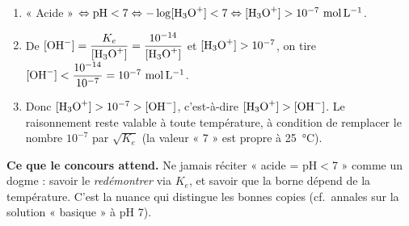\documentclass[11pt,a4paper]{article}
\begin{document}
\begin{corrbox}
\begin{enumerate}[label=\alph*),leftmargin=1.6em,itemsep=2pt]
  \item « Acide » $\Leftrightarrow \mathrm{pH}<7 \Leftrightarrow -\log[\ce{H3O+}]<7 \Leftrightarrow
        [\ce{H3O+}] > 10^{-7}\ \si{mol.L^{-1}}$.
  \item De $[\ce{OH-}] = \dfrac{K_e}{[\ce{H3O+}]} = \dfrac{10^{-14}}{[\ce{H3O+}]}$ et $[\ce{H3O+}]>10^{-7}$,
        on tire $[\ce{OH-}] < \dfrac{10^{-14}}{10^{-7}} = 10^{-7}\ \si{mol.L^{-1}}$.
  \item Donc $[\ce{H3O+}] > 10^{-7} > [\ce{OH-}]$, c'est-à-dire \textbf{$[\ce{H3O+}]>[\ce{OH-}]$}. Le
        raisonnement reste valable à toute température, à condition de remplacer le nombre $10^{-7}$ par
        $\sqrt{K_e}$ (la valeur « 7 » est propre à \SI{25}{\celsius}).
\end{enumerate}
\end{corrbox}

\begin{astuce}
\textbf{Ce que le concours attend.} Ne jamais réciter « acide = pH$<$7 » comme un dogme : savoir le
\emph{redémontrer} via $K_e$, et savoir que la borne dépend de la température. C'est la nuance qui distingue
les bonnes copies (cf.\ annales sur la solution « basique » à pH 7).
\end{astuce}
\end{document}
